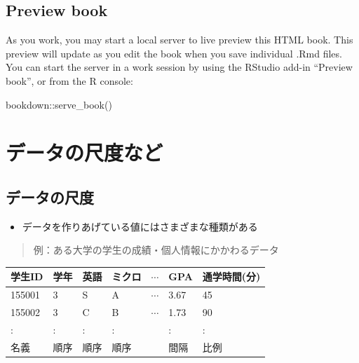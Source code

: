 \documentclass[
]{book}
\newenvironment{Shaded}{\begin{snugshade}}{\end{snugshade}}
\newcommand{\FunctionTok}[1]{\textcolor[rgb]{0.00,0.00,0.00}{#1}}
\newcommand{\NormalTok}[1]{#1}
\newcommand{\SpecialCharTok}[1]{\textcolor[rgb]{0.00,0.00,0.00}{#1}}
\providecommand{\tightlist}{%
  \setlength{\itemsep}{0pt}\setlength{\parskip}{0pt}}
\theoremstyle{definition}
\theoremstyle{definition}
\theoremstyle{definition}
\theoremstyle{definition}
\theoremstyle{remark}
\begin{document}
\hypertarget{preview-book}{%
\section{Preview book}\label{preview-book}}

As you work, you may start a local server to live preview this HTML book. This preview will update as you edit the book when you save individual .Rmd files. You can start the server in a work session by using the RStudio add-in ``Preview book'', or from the R console:

\begin{Shaded}
\begin{Highlighting}[]
\NormalTok{bookdown}\SpecialCharTok{::}\FunctionTok{serve\_book}\NormalTok{()}
\end{Highlighting}
\end{Shaded}

\hypertarget{ux30c7ux30fcux30bfux306eux5c3aux5ea6ux306aux3069}{%
\chapter{データの尺度など}\label{ux30c7ux30fcux30bfux306eux5c3aux5ea6ux306aux3069}}

\hypertarget{ux30c7ux30fcux30bfux306eux5c3aux5ea6}{%
\section{データの尺度}\label{ux30c7ux30fcux30bfux306eux5c3aux5ea6}}

\begin{itemize}
\tightlist
\item
  データを作りあげている値にはさまざまな種類がある
\end{itemize}

\begin{quote}
例：ある大学の学生の成績・個人情報にかかわるデータ
\end{quote}

\begin{longtable}[]{@{}lllllll@{}}
\toprule()
学生ID & 学年 & 英語 & ミクロ & \(\cdots\) & GPA & 通学時間(分) \\
\midrule()
\endhead
155001 & 3 & S & A & \(\cdots\) & 3.67 & 45 \\
155002 & 3 & C & B & \(\cdots\) & 1.73 & 90 \\
: & : & : & : & & : & : \\
名義 & 順序 & 順序 & 順序 & & 間隔 & 比例 \\
\bottomrule()
\end{longtable}
\end{document}
